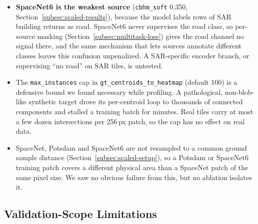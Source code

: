 \begin{itemize}
    dict of \texttt{PLEMMultiTaskLoss} exists to rebalance it, but we have not tuned the weighting.
  \item \textbf{SpaceNet6 is the weakest source} (\texttt{cbhm\_soft} 0.350,
    Section~\ref{subsec:scaled-results}), because the model labels rows of SAR building returns as
    road. SpaceNet6 never supervises the road class, so per-source masking
    (Section~\ref{subsec:multitask-loss}) gives the road channel no signal there, and the same
    mechanism that lets sources annotate different classes leaves this confusion unpenalized. A
    SAR-specific encoder branch, or supervising ``no road'' on SAR tiles, is untested.
  \item The \texttt{max\_instances} cap in \texttt{gt\_centroids\_to\_heatmap} (default 100) is a
    defensive bound we found necessary while profiling. A pathological, non-blob-like synthetic
    target drove its per-centroid loop to thousands of connected components and stalled a training
    batch for minutes. Real tiles carry at most a few dozen intersections per 256\,px patch, so the
    cap has no effect on real data.
  \item SpaceNet, Potsdam and SpaceNet6 are not resampled to a common ground sample distance
    (Section~\ref{subsec:scaled-setup}), so a Potsdam or SpaceNet6
    training patch covers a different physical area than a SpaceNet patch of the same pixel size.
    We saw no obvious failure from this, but no ablation isolates it.
\end{itemize}

\subsection{Validation-Scope Limitations}

